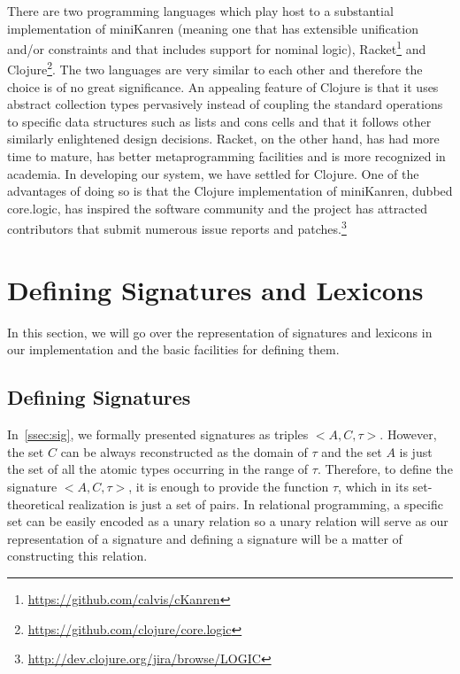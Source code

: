 There are two programming languages which play host to a substantial
implementation of miniKanren (meaning one that has extensible
unification and/or constraints and that includes support for nominal
logic), Racket\footnote{\url{https://github.com/calvis/cKanren}} and
Clojure\footnote{\url{https://github.com/clojure/core.logic}}. The two
languages are very similar to each other and therefore the choice is of
no great significance. An appealing feature of Clojure is that it uses
abstract collection types pervasively instead of coupling the standard
operations to specific data structures such as lists and cons cells and
that it follows other similarly enlightened design decisions. Racket, on
the other hand, has had more time to mature, has better metaprogramming
facilities and is more recognized in academia. In developing our system,
we have settled for Clojure. One of the advantages of doing so is that
the Clojure implementation of miniKanren, dubbed core.logic, has
inspired the software community and the project has attracted
contributors that submit numerous issue reports and
patches.\footnote{\url{http://dev.clojure.org/jira/browse/LOGIC}}


\section{Defining Signatures and Lexicons}

In this section, we will go over the representation of signatures and
lexicons in our implementation and the basic facilities for defining
them.

\subsection{Defining Signatures}
\label{ssec:def-sig}

In~\ref{ssec:sig}, we formally presented signatures as triples
$\mathopen{<}A, C, \tau\mathclose{>}$. However, the set $C$ can be
always reconstructed as the domain of $\tau$ and the set $A$ is just the
set of all the atomic types occurring in the range of $\tau$. Therefore,
to define the signature $\mathopen{<}A, C, \tau\mathclose{>}$, it is
enough to provide the function $\tau$, which in its set-theoretical
realization is just a set of pairs. In relational programming, a
specific set can be easily encoded as a unary relation so a unary
relation will serve as our representation of a signature and defining a
signature will be a matter of constructing this relation.

